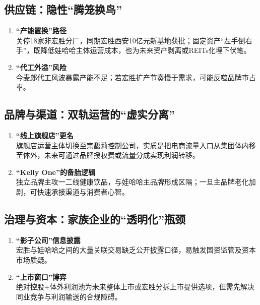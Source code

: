 \subsection{供应链：隐性“腾笼换鸟”}
\begin{enumerate}[leftmargin=*, nosep]
    \item \textbf{“产能置换”路径 } \\
    关停18家非宏胜分厂，同期宏胜西安10亿元新基地获批；固定资产“左手倒右手”，既降低娃哈哈主体运营成本，也为未来资产剥离或REITs化埋下伏笔。
    \item \textbf{“代工外溢”风险  }\\
    今麦郎代工风波暴露产能不足；若宏胜扩产节奏慢于需求，可能反噬品牌市占率。
\end{enumerate}

\subsection{品牌与渠道：双轨运营的“虚实分离”}
\begin{enumerate}[leftmargin=*, nosep]
    \item \textbf{“线上旗舰店”更名 } \\
    旗舰店运营主体切换至宗馥莉控制公司，实质是把电商流量入口从集团体内移至体外，未来可通过品牌授权费或流量分成实现利润转移。
    \item \textbf{“Kelly One”的备胎逻辑}  \\
    {\color{red}独立品牌主攻一二线健康饮品，与娃哈哈主品牌形成区隔；一旦主品牌老化加剧，可快速承接渠道与消费者心智。}
\end{enumerate}

\subsection{治理与资本：家族企业的“透明化”瓶颈}
\begin{enumerate}[leftmargin=*, nosep]
    \item \textbf{“影子公司”信息披露}  \\
    宏胜与娃哈哈之间的大量关联交易缺乏公开披露口径，易触发国资监管及资本市场质疑。
    \item \textbf{“上市窗口”博弈  }\\
    绝对控股+体外利润池为未来整体上市或宏胜分拆上市提供选项，但需先解决同业竞争与利润输送的合规障碍。
\end{enumerate}

